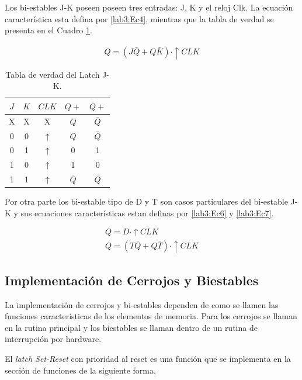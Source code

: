 Los bi-estables J-K poseen poseen tres entradas: J, K y el reloj Clk. La ecuación característica esta defina por \eqref{lab3:Ec4}, mientras que la tabla de verdad se presenta en el Cuadro \ref{tab:JK}. 

\begin{eqnarray}
	\label{lab3:Ec4}
	Q=(J\bar{Q}+Q\bar{K})\cdot\uparrow CLK
\end{eqnarray}


\begin{table}
    \centering
    \caption{Tabla de verdad del Latch J-K.}
    \label{tab:JK}
    \begin{tabular}{ccccc}
        \toprule
        $J$ & $K$ & $CLK$ & $Q+$ & $\bar{Q}+$ \\
        \midrule
        X & X &	X &	$Q$	& $\bar{Q}$	\\ 
        0 & 0 &	$\uparrow$ & $Q$ & $\bar{Q}$ \\ 
        0 & 1 &	$\uparrow$ & 0 & 1 \\ 
        1 & 0 & $\uparrow$ & 1 & 0 \\ 	
        1 & 1 &	$\uparrow$ & $\bar{Q}$ &  $Q$ \\ 	
        \bottomrule
    \end{tabular} 
\end{table} 

Por otra parte los bi-estable tipo de D y T son casos particulares del bi-estable J-K y sus ecuaciones características estan definas por \eqref{lab3:Ec6} y \eqref{lab3:Ec7}. 

\begin{eqnarray}
\label{lab3:Ec6}
Q=D\cdot\uparrow CLK \\ \label{lab3:Ec7}
Q=(T\bar{Q}+Q\bar{T})\cdot\uparrow CLK
\end{eqnarray}


\subsection{Implementación de Cerrojos y Biestables}

La implementación de cerrojos y bi-estables dependen de como se llamen las funciones características de los elementos de memoria. Para los cerrojos se llaman en la rutina principal y los biestables se llaman dentro de un rutina de interrupción por hardware.

El \textit{latch Set-Reset} con prioridad al reset es una función que se implementa en la sección de funciones de la siguiente forma,

